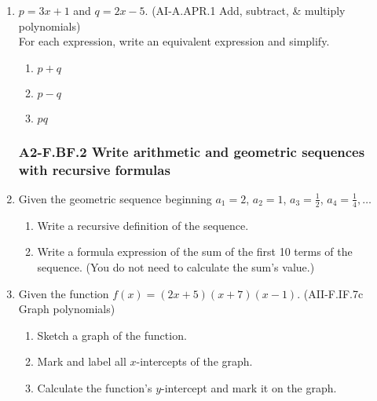 \documentclass[12pt, twoside]{article}
\begin{document}
\begin{enumerate}
\item $p = 3x +1$ and $q = 2x-5$. \hfill (AI-A.APR.1 Add, subtract, \& multiply polynomials) \\[0.5cm]
For each expression, write an equivalent expression and simplify.
    \begin{enumerate}[itemsep=0.5cm]
        \item $p+q$
        \item $p-q$
        \item $pq$
    \end{enumerate}

\newpage
\subsubsection*{A2-F.BF.2 Write arithmetic and geometric sequences with recursive formulas}
\item Given the geometric sequence beginning $a_1 = 2$, $a_2 = 1$, $a_3 = \frac{1}{2}$, $a_4 = \frac{1}{4}, \ldots$      
    \begin{enumerate}[itemsep=2cm]
        \item Write a recursive definition of the sequence.
        \item Write a formula expression of the sum of the first 10 terms of the sequence. (You do not need to calculate the sum's value.)
    \end{enumerate}
    \vspace{2cm}

\item Given the function $f(x)=(2x+5)(x+7)(x-1)$. \hfill (AII-F.IF.7c Graph polynomials)
    \begin{center}
    \end{center}
    \begin{enumerate}
        \item Sketch a graph of the function.
        \item Mark and label all $x$-intercepts of the graph.
        \item Calculate the function's $y$-intercept and mark it on the graph.
    \end{enumerate}


\end{enumerate}
\end{document}
